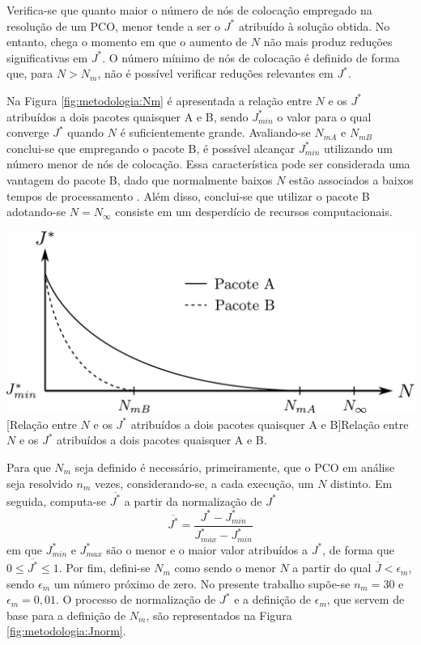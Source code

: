 Verifica-se que quanto maior o número de nós de colocação empregado na resolução de um PCO, menor tende a ser o $ J^* $ atribuído à solução obtida. No entanto, chega o momento em que o aumento de $ N $ não mais produz reduções significativas em $ J^* $. O número mínimo de nós de colocação é definido de forma que, para $ N > N_m $, não é possível verificar reduções relevantes em $ J^* $. 

Na Figura \ref{fig:metodologia:Nm} é apresentada a relação entre $ N $ e os $ J^* $ atribuídos a dois pacotes quaisquer A e B, sendo $ J^*_{min} $ o valor para o qual converge $ J^* $ quando $ N $ é suficientemente grande. Avaliando-se $ N_{mA} $ e $ N_{mB} $ conclui-se que empregando o pacote B, é possível alcançar $ J^*_{min} $ utilizando um número menor de nós de colocação. Essa característica pode ser considerada uma vantagem do pacote B, dado que normalmente baixos $ N $ estão associados a baixos tempos de processamento \cite{kelly_introduction_2017}. Além disso, conclui-se que utilizar o pacote B adotando-se $ N = N_\infty $ consiste em um desperdício de recursos computacionais.   
 
\noindent	
\begin{minipage}{\textwidth}
	\vspace{\onelineskip}
	\centering
	\includegraphics[width=0.75\linewidth]{draw/metodologia/pdf/Nm}
	[Relação entre $ N $ e os $ J^* $ atribuídos a dois pacotes quaisquer A e B]{Relação entre $ N $ e os $ J^* $ atribuídos a dois pacotes quaisquer A e B.}
	\label{fig:metodologia:Nm}
	\vspace{\onelineskip}
\end{minipage}

Para que $ N_m $ seja definido é necessário, primeiramente, que o PCO em análise seja resolvido $ n_m $ vezes, considerando-se, a cada execução, um $ N $ distinto. Em seguida, computa-se $ \overline{J^*} $ a partir da normalização de $ J^* $
%
\begin{equation}
	\overline{J^*} = \frac{J^* - J^*_{min}}{J^*_{max} - J^*_{min}}
\end{equation}
%
em que $ J^*_{min} $ e $ J^*_{max} $ são o menor e o maior valor atribuídos a $ J^* $, de forma que $ 0 \leq \overline{J^*} \leq 1 $. Por fim, defini-se $ N_m $ como sendo o menor $ N $ a partir do qual $ \overline{J} < \epsilon_m $, sendo $ \epsilon_m $ um número próximo de zero. No presente trabalho supõe-se $ n_m = 30 $ e $ \epsilon_m = 0,01 $. O processo de normalização de $ J^* $ e a definição de $ \epsilon_m $, que servem de base para a definição de $ N_m $, são representados na Figura \ref{fig:metodologia:Jnorm}. 

